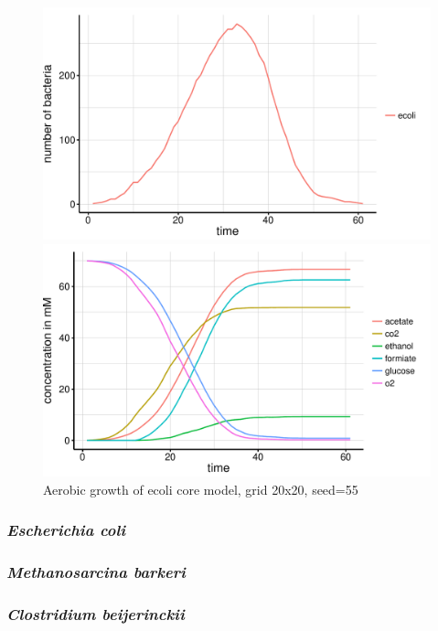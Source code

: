 \begin{figure}[h]
  \centering
  \begin{minipage}[t]{0.45\textwidth}
    \includegraphics[width=\textwidth]{../results/ecoli_20x20_aerob_seed55_growth.pdf}
  \end{minipage}
  \begin{minipage}[t]{0.45\textwidth}
    \includegraphics[width=\textwidth]{../results/ecoli_20x20_aerob_seed55_subs.pdf}
  \end{minipage}
  \caption{Aerobic growth of ecoli core model, grid 20x20, seed=55}
\end{figure}
\subsubsection{\textit{Escherichia coli}}
\subsubsection{\textit{Methanosarcina barkeri}}
\subsubsection{\textit{Clostridium beijerinckii}}

